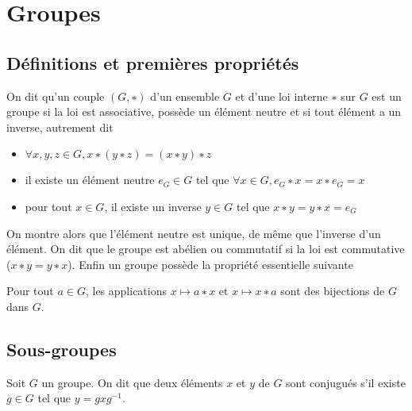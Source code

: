 \section{Groupes}

\subsection{Définitions et premières propriétés}

\begin{de}
On dit qu'un couple $(G,∗)$ d'un ensemble $G$ et d'une loi interne $∗$ sur $G$ est un groupe si la loi est associative, possède un élément neutre et si tout élément a un inverse, autrement dit
\begin{itemize}
\itemsep1pt\parskip0pt
\item $\forall x,y,z \in G, x ∗ (y ∗ z) = (x ∗ y) ∗ z$
\item il existe un élément neutre $e_G \in G$ tel que $\forall x \in G, e_G ∗ x = x ∗ e_G = x$
\item pour tout $x \in G$, il existe un inverse $y \in G$ tel que $x ∗ y = y ∗ x = e_G$
\end{itemize}
\end{de}

\begin{rem}
On montre alors que l'élément neutre est unique, de même que l'inverse d'un élément. On dit que le groupe est abélien ou commutatif si la loi est commutative ($x ∗ y = y ∗ x$). Enfin un groupe possède la propriété essentielle suivante
\end{rem}

\begin{prop}
Pour tout $a \in G$, les applications $x \mapsto a ∗ x$ et $x \mapsto x ∗ a$ sont des bijections de $G$ dans $G$.
\end{prop}

\subsection{Sous-groupes}

\begin{de}
Soit $G$ un groupe. On dit que deux éléments $x$ et $y$ de $G$ sont conjugués s'il existe $g \in G$ tel que $y = gxg^{-1}$.
\end{de}

